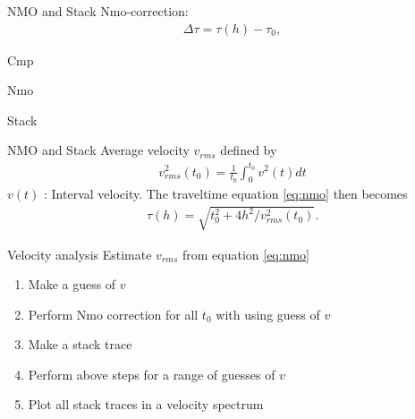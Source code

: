 \begin{frame}{NMO and Stack}
Nmo-correction:
%
\begin{eqnarray}
 \Delta \tau = \tau(h)-\tau_0,
\label{eq:dtnmo}
\end{eqnarray}
\end{frame}
%
\begin{frame}{Cmp}
\end{frame}
\begin{frame}{Nmo}
\end{frame}
\begin{frame}{Stack}
\end{frame}
\begin{frame}{NMO and Stack}
Average velocity $v_{rms}$ defined by
\begin{eqnarray}
 v^2_{rms}(t_0)=\frac{1}{t_0}\int^{t_0}_0 v^2(t)dt
\label{eq:rms}
\end{eqnarray}
$v(t)$ : Interval velocity.
The traveltime equation \eqref{eq:nmo} then becomes
\begin{eqnarray}
\tau(h)=\sqrt{t^2_0+4h^2/v^2_{rms}(t_0)}.
\label{eq:nmorms}
\end{eqnarray}
\end{frame}
\begin{frame}{Velocity analysis}
%
  Estimate $v_{rms}$ from equation \eqref{eq:nmo}
\begin{enumerate}
  \item Make a guess of $v$ 
  \item Perform Nmo correction for all $t_0$ with using guess of $v$
  \item Make a stack trace
  \item Perform above steps for a range of guesses of $v$
  \item Plot all stack traces in a velocity spectrum
\end{enumerate}
\end{frame}
